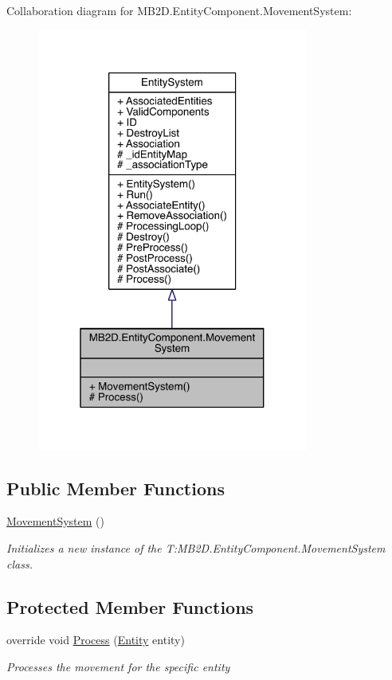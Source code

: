 Collaboration diagram for M\+B2\+D.\+Entity\+Component.\+Movement\+System\+:\nopagebreak
\begin{figure}[H]
\begin{center}
\leavevmode
\includegraphics[width=253pt]{class_m_b2_d_1_1_entity_component_1_1_movement_system__coll__graph}
\end{center}
\end{figure}
\subsection*{Public Member Functions}
\begin{DoxyCompactItemize}
\item 
\hyperlink{class_m_b2_d_1_1_entity_component_1_1_movement_system_a64ad47c34d25ff6a9df2d2d841fc7cfb}{Movement\+System} ()
\begin{DoxyCompactList}\small\item\em Initializes a new instance of the T\+:\+M\+B2\+D.\+Entity\+Component.\+Movement\+System class. \end{DoxyCompactList}\end{DoxyCompactItemize}
\subsection*{Protected Member Functions}
\begin{DoxyCompactItemize}
\item 
override void \hyperlink{class_m_b2_d_1_1_entity_component_1_1_movement_system_afa730fd9080848ce877206c00a744cdf}{Process} (\hyperlink{class_m_b2_d_1_1_entity_component_1_1_entity}{Entity} entity)
\begin{DoxyCompactList}\small\item\em Processes the movement for the specific entity \end{DoxyCompactList}\end{DoxyCompactItemize}
